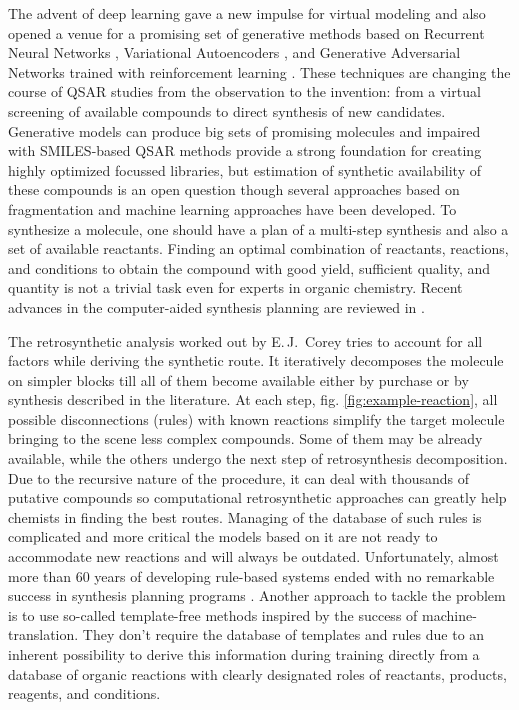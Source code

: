 \documentclass{article}
\begin{document}
The advent of deep learning \cite{ChenDrugDiscovery, Renaissance} gave a new impulse for virtual modeling and also opened a venue for a promising set of generative methods based on Recurrent Neural Networks \cite{ErtlLSTM}, Variational Autoencoders \cite{DuvenaudVAE}, and Generative Adversarial Networks trained with reinforcement learning \cite{ORGAN,OlivecronaReinforcment}. These techniques are changing the course of QSAR studies from the observation to the invention: from a virtual screening of available compounds to direct synthesis of new candidates. Generative models can produce big sets of promising molecules and impaired with SMILES-based QSAR methods \cite{TetkoCNF} provide a strong foundation for creating highly optimized focussed libraries, but estimation of synthetic availability of these compounds is an open question though several approaches based on fragmentation \cite{ErtlSaScore} and machine learning \cite{ColeySCScore} approaches have been developed. 
To synthesize a molecule, one should have a plan of a multi-step synthesis and also a set of available reactants. 
Finding an optimal combination of reactants, reactions, and conditions to obtain the compound with good yield, sufficient quality, and quantity is not a trivial task even for experts in organic chemistry. Recent advances in the computer-aided synthesis planning are reviewed in \cite{ColeyReview,EnkvinstReview,BaskinReview}. 

The retrosynthetic analysis worked out by E.\,J.~Corey \cite{Corey} tries to account for all factors while deriving the synthetic route. It iteratively decomposes the molecule on simpler blocks till all of them become available either by purchase or by synthesis described in the literature. At each step, fig. \ref{fig:example-reaction}, all possible disconnections (rules) with known reactions simplify the target molecule bringing to the scene less complex compounds. Some of them may be already available, while the others undergo the next step of retrosynthesis decomposition. Due to the recursive nature of the procedure, it can deal with thousands of putative compounds so computational retrosynthetic approaches can greatly help chemists in finding the best routes. Managing of the database of such rules is complicated and more critical the models based on it are not ready to accommodate new reactions and will always be outdated. Unfortunately, almost more than 60 years of developing rule-based systems ended with no remarkable success in synthesis planning programs \cite{Preuss}. Another approach to tackle the problem is to use so-called template-free methods inspired by the success of machine-translation. They don't require the database of templates and rules due to an inherent possibility to derive this information during training directly from a database of organic reactions with clearly designated roles of reactants, products, reagents, and conditions.
\end{document}
